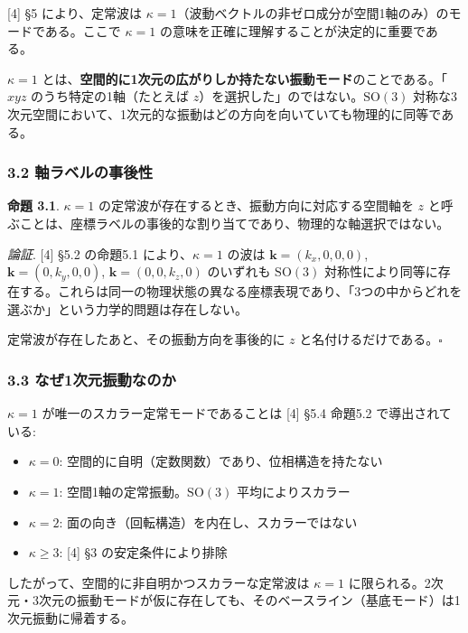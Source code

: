 \documentclass[
  a4paper,11pt]{ltjsarticle}
\providecommand{\tightlist}{%
  \setlength{\itemsep}{0pt}\setlength{\parskip}{0pt}}
\begin{document}
{[}4{]} §5 により、定常波は
\(\kappa = 1\)（波動ベクトルの非ゼロ成分が空間1軸のみ）のモードである。ここで
\(\kappa = 1\) の意味を正確に理解することが決定的に重要である。

\(\kappa = 1\)
とは、\textbf{空間的に1次元の広がりしか持たない振動モード}のことである。「\(xyz\)
のうち特定の1軸（たとえば
\(z\)）を選択した」のではない。\(\mathrm{SO}(3)\)
対称な3次元空間において、1次元的な振動はどの方向を向いていても物理的に同等である。

\subsubsection{3.2
軸ラベルの事後性}\label{ux8ef8ux30e9ux30d9ux30ebux306eux4e8bux5f8cux6027}

\textbf{命題 3.1}. \(\kappa = 1\)
の定常波が存在するとき、振動方向に対応する空間軸を \(z\)
と呼ぶことは、座標ラベルの事後的な割り当てであり、物理的な軸選択ではない。

\emph{論証}. {[}4{]} §5.2 の命題5.1 により、\(\kappa = 1\) の波は
\(\mathbf{k} = (k_x, 0, 0, 0)\), \(\mathbf{k} = (0, k_y, 0, 0)\),
\(\mathbf{k} = (0, 0, k_z, 0)\) のいずれも \(\mathrm{SO}(3)\)
対称性により同等に存在する。これらは同一の物理状態の異なる座標表現であり、「3つの中からどれを選ぶか」という力学的問題は存在しない。

定常波が存在したあと、その振動方向を事後的に \(z\)
と名付けるだけである。\(\square\)

\subsubsection{3.3
なぜ1次元振動なのか}\label{ux306aux305c1ux6b21ux5143ux632fux52d5ux306aux306eux304b}

\(\kappa = 1\) が唯一のスカラー定常モードであることは {[}4{]} §5.4
命題5.2 で導出されている:

\begin{itemize}
\tightlist
\item
  \(\kappa = 0\): 空間的に自明（定数関数）であり、位相構造を持たない
\item
  \(\kappa = 1\): 空間1軸の定常振動。\(\mathrm{SO}(3)\)
  平均によりスカラー
\item
  \(\kappa = 2\): 面の向き（回転構造）を内在し、スカラーではない
\item
  \(\kappa \geq 3\): {[}4{]} §3 の安定条件により排除
\end{itemize}

したがって、空間的に非自明かつスカラーな定常波は \(\kappa = 1\)
に限られる。2次元・3次元の振動モードが仮に存在しても、そのベースライン（基底モード）は1次元振動に帰着する。
\end{document}
